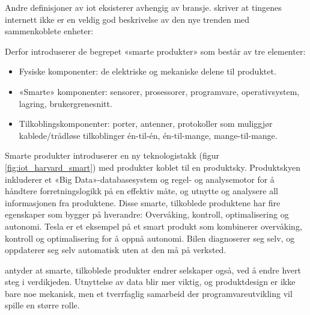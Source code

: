 Andre definisjoner av \gls{iot} eksisterer avhengig av bransje. \citet{iot_harvard_smart} skriver
at tingenes internett ikke er en veldig god beskrivelse av den nye trenden med
sammenkoblete enheter: 

Derfor introduserer de begrepet «smarte produkter» som består av tre elementer:

 \begin{itemize}
    \item Fysiske komponenter: de elektriske og mekaniske delene til produktet.
    \item «Smarte» komponenter: sensorer, prosessorer, programvare, operativsystem, lagring, brukergrenesnitt.
    \item Tilkoblingskomponenter: porter, antenner, protokoller som muliggjør kablede/trådløse tilkoblinger
    én-til-én, én-til-mange, mange-til-mange.
\end{itemize}

Smarte produkter introduserer en ny teknologistakk (figur \ref{fig:iot_harvard_smart}) med produkter koblet til
en produktsky. Produktskyen inkluderer et «Big Data»-databasesystem og regel- og analysemotor for å håndtere
forretningslogikk på en effektiv måte, og utnytte og analysere all informasjonen fra produktene.
Disse smarte, tilkoblede produktene har fire egenskaper som bygger på hverandre: Overvåking, kontroll,
optimalisering og autonomi. Tesla er et eksempel på et smart produkt som kombinerer overvåking, kontroll og
optimalisering for å oppnå autonomi. Bilen diagnoserer seg selv, og oppdaterer seg selv automatisk uten
at den må på verksted.

\citet{iot_harvard_smartcompanies} antyder at smarte, tilkoblede produkter endrer selskaper også, ved
å endre hvert steg i verdikjeden. Utnyttelse av data blir mer viktig, og produktdesign er ikke bare noe
mekanisk, men et tverrfaglig samarbeid der programvareutvikling vil spille en større rolle. 

